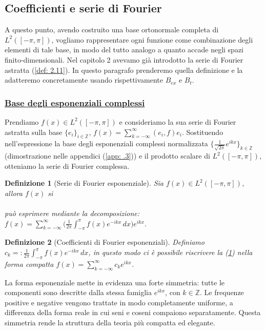 \documentclass[a4paper,12pt]{report}
\newtheorem{definizione}{Definizione}[chapter]
\begin{document}
\subsection{Coefficienti e serie di Fourier}\label{sec: 3.4.2}

A questo punto, avendo costruito una base ortonormale completa di $L^2([-\pi,\pi])$, vogliamo rappresentare ogni funzione come combinazione degli elementi di tale base, in modo del tutto analogo a quanto accade negli spazi finito-dimensionali. Nel capitolo 2 avevamo già introdotto la serie di Fourier astratta (\ref{def: 2.11}). In questo paragrafo prenderemo quella definizione e la adatteremo concretamente usando rispettivamente $B_{ex}$ e $B_t$.

\subsubsection{\underline{Base degli esponenziali complessi}}

Prendiamo $f(x)\in L^2([-\pi,\pi])$ e consideriamo la sua serie di Fourier astratta sulla base $\{e_i\}_{i\in \mathbb{Z}}$, $\displaystyle f(x)=\sum_{k=-\infty}^\infty(e_i, f)e_i$. Sostituendo nell'espressione la base degli esponenziali complessi normalizzata $\bigg\{\displaystyle\frac{1}{\sqrt{2\pi}}e^{ikx}\bigg\}_{k\in \mathbb{Z}}$ (dimostrazione nelle appendici (\ref{app: .3})) e il prodotto scalare di $L^2([-\pi,\pi])$, otteniamo la serie di Fourier complessa.

\begin{definizione}[Serie di Fourier esponenziale]\label{def: 3.26}
    Sia $f(x)\in L^2([-\pi,\pi])$, allora $f(x)$ si
    \\
    \\può esprimere mediante la decomposizione: $\displaystyle f(x)=\sum_{k=-\infty}^\infty \bigg(\frac{1}{2\pi}\int_{-\pi}^\pi f(x)e^{-ikx}\,dx\bigg)e^{ikx}$.
\end{definizione}

\begin{definizione}[Coefficienti di Fourier esponenziali]
    Definiamo $c_k=:\displaystyle\frac{1}{2\pi}\int_{-\pi}^\pi f(x)e^{-ikx}\,dx$, in questo modo ci è possibile riscrivere la (\ref{def: 3.26}) nella forma compatta $f(x)=\displaystyle\sum_{k=-\infty}^\infty c_ke^{ikx}$.
\end{definizione} 

La forma esponenziale mette in evidenza una forte simmetria: tutte le componenti sono descritte dalla stessa famiglia $e^{ikx}$, con $k\in\mathbb{Z}$. Le frequenze positive e negative vengono trattate in modo completamente uniforme, a differenza della forma reale in cui seni e coseni compaiono separatamente. Questa simmetria rende la struttura della teoria più compatta ed elegante.
\end{document}
